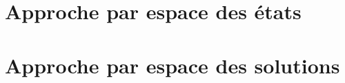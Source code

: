 \documentclass[12pt]{report}
\begin{document}
\hypersetup{hidelinks}
 
\tableofcontents

\newpage

\part{Approche par espace des états}\label{part1} 

\newpage

\newpage

\newpage

\part{Approche par espace des solutions}




\listoffigures
\listoftables


\end{document}
